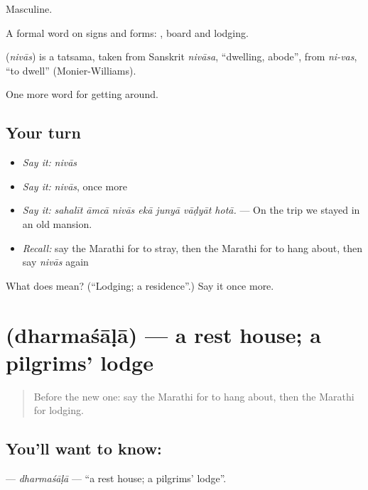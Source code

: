 Masculine.

A formal word on signs and forms:   , board and lodging.

\begin{cousinweb}
\textbf{} (\emph{nivās}) is a tatsama, taken from Sanskrit \emph{nivāsa}, \textquotedblleft{}dwelling, abode\textquotedblright{}, from \emph{ni-vas}, \textquotedblleft{}to dwell\textquotedblright{} (Monier-Williams).
\end{cousinweb}

\begin{grammarlens}[title={What you've built}]
One more word for getting around.
\end{grammarlens}

\subsection*{Your turn}
\begin{itemize}
\raggedright
  \item \emph{Say it:} \emph{nivās}
  \item \emph{Say it:} \emph{nivās}, once more
  \item \emph{Say it:} \emph{sahalīt āmcā nivās ekā junyā vāḍyāt hotā.} — On the trip we stayed in an old mansion.
  \item \emph{Recall:} say the Marathi for to stray, then the Marathi for to hang about, then say \emph{nivās} again
\end{itemize}

\begin{tcolorbox}[breakable,colback=teal!4,colframe=teal!35!black,title={Before you move on}]
What does  mean? (\textquotedblleft{}Lodging; a residence\textquotedblright{}.) Say it once more.
\end{tcolorbox}
\section[\texorpdfstring{\mr{धर्मशाळा} (dharmaśāḷā)}{धर्मशाळा (dharmaśāḷā)}]{ (dharmaśāḷā) — a rest house; a pilgrims’ lodge}

\label{lesson:MR-C413-dharmasala}



\begin{quote}
Before the new one: say the Marathi for to hang about, then the Marathi for lodging.
\end{quote}

\subsection*{You'll want to know: }
\textbf{} — \emph{dharmaśāḷā} — \textquotedblleft{}a rest house; a pilgrims’ lodge\textquotedblright{}.

